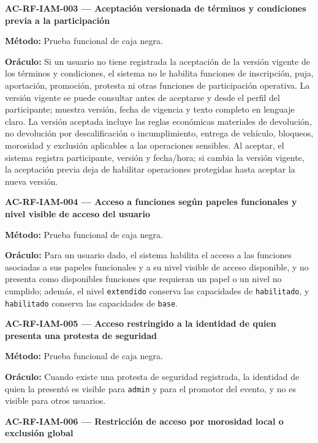 \documentclass[10pt,letterpaper]{article}
\begin{document}
\noindent\textbf{AC-RF-IAM-003 --- Aceptación versionada de términos y condiciones previa a la participación}\par
\textbf{Método:} Prueba funcional de caja negra.\par
\textbf{Oráculo:} Si un usuario no tiene registrada la aceptación de la versión vigente de los términos y condiciones, el sistema no le habilita funciones de inscripción, puja, aportación, promoción, protesta ni otras funciones de participación operativa. La versión vigente se puede consultar antes de aceptarse y desde el perfil del participante; muestra versión, fecha de vigencia y texto completo en lenguaje claro. La versión aceptada incluye las reglas económicas materiales de devolución, no devolución por descalificación o incumplimiento, entrega de vehículo, bloqueos, morosidad y exclusión aplicables a las operaciones sensibles. Al aceptar, el sistema registra participante, versión y fecha/hora; si cambia la versión vigente, la aceptación previa deja de habilitar operaciones protegidas hasta aceptar la nueva versión.\par\vspace{0.45em}
\noindent\textbf{AC-RF-IAM-004 --- Acceso a funciones según papeles funcionales y nivel visible de acceso del usuario}\par
\textbf{Método:} Prueba funcional de caja negra.\par
\textbf{Oráculo:} Para un usuario dado, el sistema habilita el acceso a las funciones asociadas a sus papeles funcionales y a su nivel visible de acceso disponible, y no presenta como disponibles funciones que requieran un papel o un nivel no cumplido; además, el nivel \texttt{extendido} conserva las capacidades de \texttt{habilitado}, y \texttt{habilitado} conserva las capacidades de \texttt{base}.\par\vspace{0.45em}
\noindent\textbf{AC-RF-IAM-005 --- Acceso restringido a la identidad de quien presenta una protesta de seguridad}\par
\textbf{Método:} Prueba funcional de caja negra.\par
\textbf{Oráculo:} Cuando existe una protesta de seguridad registrada, la identidad de quien la presentó es visible para \texttt{admin} y para el promotor del evento, y no es visible para otros usuarios.\par\vspace{0.45em}
\noindent\textbf{AC-RF-IAM-006 --- Restricción de acceso por morosidad local o exclusión global}\par
\end{document}
